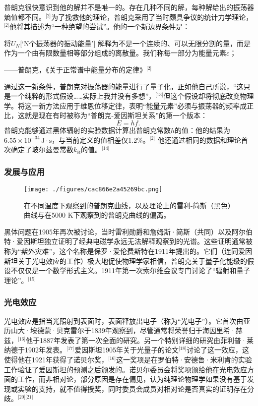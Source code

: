普朗克很快意识到他的解并不是唯一的。存在几种不同的解，每种解给出的振荡器熵值都不同。\(^\text{[2]}\)为了挽救他的理论，普朗克采用了当时颇具争议的统计力学理论，\(^\text{[2]}\)他将其描述为“一种绝望的尝试”。他的一个新边界条件是：

将\( U_N \)[‘N个振荡器的振动能量’] 解释为不是一个连续的、可以无限分割的量，而是作为一个由有限数量相等部分组成的离散量。我们称每一部分为能量元素\(\varepsilon\)；

——普朗克，《关于正常谱中能量分布的定律》\(^\text{[2]}\)

通过这一新条件，普朗克对振荡器的能量进行了量子化，正如他自己所说，“这只是一个纯粹的形式假设……实际上我并没有多想”，\(^\text{[13]}\)但这个假设却将彻底改变物理学。将这一新方法应用于维恩位移定律，表明“能量元素”必须与振荡器的频率成正比，这就是现在有时被称为“普朗克-爱因斯坦关系”的第一个版本：
\[
E = hf.~
\]
普朗克能够通过黑体辐射的实验数据计算出普朗克常数\(h\)的值：他的结果为\( 6.55 \times 10^{-34} \, \text{J} \cdot \text{s}\)，与当前定义的值相差仅1.2\%。\(^\text{[2]}\) 他还通过相同的数据和理论首次确定了玻尔兹曼常数\(k_{\text{B}}\)的值。\(^\text{[14]}\)
\subsubsection{发展与应用}
\begin{figure}[ht]
\centering
\texttt{[image: ./figures/cac866e2a45269bc.png]}
\caption{在不同温度下观察到的普朗克曲线，以及理论上的雷利-简斯（黑色）曲线与在5000 K下观察到的普朗克曲线的偏离。} \label{fig_PLKCS_3}
\end{figure}
黑体问题在1905年再次被讨论，当时雷利勋爵和詹姆斯·简斯（共同）以及阿尔伯特·爱因斯坦独立证明了经典电磁学永远无法解释观察到的光谱。这些证明通常被称为“紫外灾难”，这个名称是保罗·爱伦费斯特在1911年提出的。它们（连同爱因斯坦关于光电效应的工作）极大地促使物理学家相信，普朗克关于量子化能级的假设不仅仅是一个数学形式主义。1911年第一次索尔维会议专门讨论了“辐射和量子理论”。\(^\text{[15]}\)
\subsubsection{光电效应}  
光电效应是指当光照射到表面时，表面释放出电子（称为“光电子”）。它首次由亚历山大·埃德蒙·贝克雷尔于1839年观察到，尽管通常将荣誉归于海因里希·赫兹，\(^\text{[16]}\)他于1887年发表了第一次全面的研究。另一个特别详细的研究由菲利普·莱纳德于1902年发表。\(^\text{[17]}\)爱因斯坦1905年关于光量子的论文\(^\text{[18]}\)讨论了这一效应，这使得他在1921年获得了诺贝尔奖，\(^\text{[16]}\)这一奖项是在罗伯特·安德鲁·米利肯的实验工作验证了爱因斯坦的预测之后颁发的。诺贝尔委员会将奖项颁给他在光电效应方面的工作，而非相对论，部分原因是存在偏见，认为纯理论物理学如果没有基于发现或实验的支持，就不值得授奖，同时委员会成员对相对论是否真实的证明存在分歧。\(^\text{[20][21]}\)

